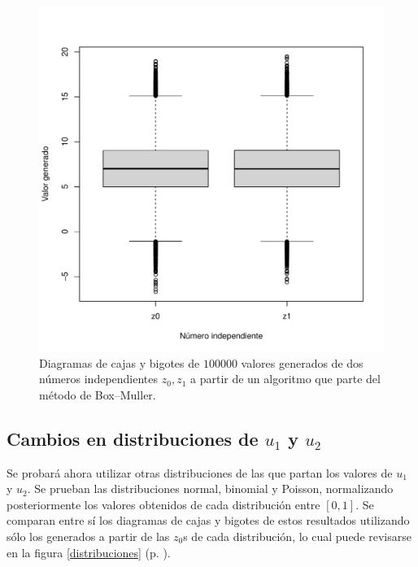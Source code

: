 \documentclass[paper=leter, fontsize=11pt]{scrartcl}
\numberwithin{equation}{section}		%
\numberwithin{figure}{section}			%
\numberwithin{table}{section}				%
\begin{document}
\begin{figure}
    \centering
    \includegraphics[width=1\textwidth]{gaussian_boxplot.pdf}
    \caption{Diagramas de cajas y bigotes de $100000$ valores generados de dos números independientes $z_0, z_1$ a partir de un algoritmo que parte del método de Box--Muller.}
    \label{gaussian_boxplot}
\end{figure}

\subsection{Cambios en distribuciones de $u_1$ y $u_2$}
Se probará ahora utilizar otras distribuciones de las que partan los valores de $u_1$ y $u_2$. Se prueban las distribuciones normal, binomial y Poisson, normalizando posteriormente los valores obtenidos de cada distribución entre $[0, 1]$. Se comparan entre sí los diagramas de cajas y bigotes de estos resultados utilizando sólo los generados a partir de las $z_0$s de cada distribución, lo cual puede revisarse en la figura \ref{distribuciones} (p. \pageref{distribuciones}).
\end{document}
